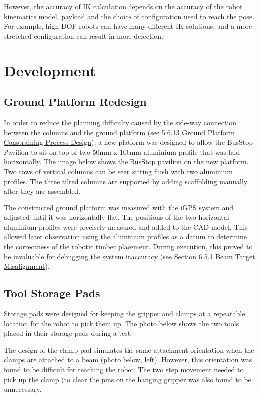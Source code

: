 However, the accuracy of IK calculation depends on the accuracy of the robot kinematics model, payload and the choice of configuration used to reach the pose. For example, high-DOF robots can have many different IK solutions, and a more stretched configuration can result in more defection. 

\section{Development}

\subsection{Ground Platform Redesign}

In order to reduce the planning difficulty caused by the side-way connection between the columns and the ground platform (see \ul{5.6.13 Ground Platform Constraining Process Design}), a new platform was designed to allow the BusStop Pavilion to sit on top of two 50mm x 100mm aluminium profile that was laid horizontally. The image below shows the BusStop pavilion on the new platform. Two rows of vertical columns can be seen sitting flush with two aluminium profiles. The three tilted columns are supported by adding scaffolding manually after they are assembled.



The constructed ground platform was measured with the iGPS system and adjusted until it was horizontally flat. The positions of the two horizontal aluminium profiles were precisely measured and added to the CAD model. This allowed later observation using the aluminium profiles as a datum to determine the correctness of the robotic timber placement. During execution, this proved to be invaluable for debugging the system inaccuracy (see \ul{Section 6.5.1 Beam Target Misalignment}).

\subsection{Tool Storage Pads}

Storage pads were designed for keeping the gripper and clamps at a repeatable location for the robot to pick them up. The photo below shows the two tools placed in their storage pads during a test. 




The design of the clamp pad simulates the same attachment orientation when the clamps are attached to a beam (photo below, left). However, this orientation was found to be difficult for teaching the robot. The two step movement needed to pick up the clamp (to clear the pins on the hanging gripper was also found to be unnecessary. 

